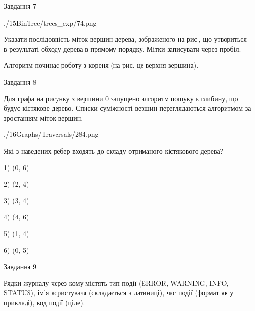 \documentclass[12pt, ukrainian]{article}
\begin{document}
{\vspace{10mm}\par

\newpage
\begin{minipage}[t]{9.7cm}
               
{\begin{center}Завдання {7}\end{center}}
\vspace{-6mm}

\begin{center}
	{./15BinTree/trees_exp/74.png}
\end{center}
Указати послідовність міток вершин дерева, зображеного на рис., що утвориться в результаті обходу дерева в прямому порядку. Мітки записувати через пробіл.\par Алгоритм починає роботу з кореня (на рис. це верхня вершина).\par

\end{minipage}
\vline \hspace{8mm}
\begin{minipage}[t]{8.0cm}
               
{\begin{center}Завдання {8}\end{center}}
\vspace{-6mm}
Для графа на рисунку з вершини 0 запущено алгоритм пошуку в глибину, що будує кістякове дерево. Списки суміжності вершин переглядаються алгоритмом за зростанням міток вершин.\par
\begin{center}
	{./16Graphs/Traversals/284.png}
\end{center}
\par Які з наведених ребер входять до складу отриманого кістякового дерева?\par
1) (0, 6)\par
2) (2, 4)\par
3) (3, 4)\par
4) (4, 6)\par
5) (1, 4)\par
6) (0, 5)\par
{\vskip 15pt} \par

\end{minipage}

               
{\begin{center}Завдання {9}\end{center}}
\vspace{-6mm}
Рядки журналу через кому містять тип події (ERROR, WARNING, INFO, STATUS), ім'я користувача (складається з латиниці), час події (фор\-мат як у прикладі), код події (ціле).

}
\end{document}
